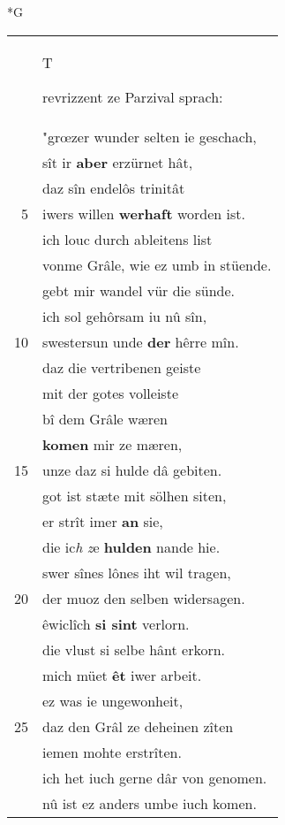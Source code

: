 \documentclass[8pt,a4paper,notitlepage]{article}
\begin{document}
\begin{table}[ht]
\begin{minipage}[t]{0.5\linewidth}
\small
\begin{center}*G
\end{center}
\begin{tabular}{rl}
 & \begin{large}T\end{large}revrizzent ze Parzival sprach:\\ 
 & "grœzer wunder selten ie geschach,\\ 
 & sît ir \textbf{aber} erzürnet hât,\\ 
 & daz sîn endelôs trinitât\\ 
5 & iwers willen \textbf{werhaft} worden ist.\\ 
 & ich louc durch ableitens list\\ 
 & vonme Grâle, wie ez umb in stüende.\\ 
 & gebt mir wandel vür die sünde.\\ 
 & ich sol gehôrsam iu nû sîn,\\ 
10 & swestersun unde \textbf{der} hêrre mîn.\\ 
 & daz die vertribenen geiste\\ 
 & mit der gotes volleiste\\ 
 & bî dem Grâle wæren\\ 
 & \textbf{komen} mir ze mæren,\\ 
15 & unze daz si hulde dâ gebiten.\\ 
 & got ist stæte mit sölhen siten,\\ 
 & er strît imer \textbf{an} sie,\\ 
 & die ic\textit{h} \textit{z}e \textbf{hulden} nande hie.\\ 
 & swer sînes lônes iht wil tragen,\\ 
20 & der muoz den selben widersagen.\\ 
 & êwiclîch \textbf{si sint} verlorn.\\ 
 & die vlust si selbe hânt erkorn.\\ 
 & mich müet \textbf{êt} iwer arbeit.\\ 
 & ez was ie ungewonheit,\\ 
25 & daz den Grâl ze deheinen zîten\\ 
 & iemen mohte erstrîten.\\ 
 & ich het iuch gerne dâr von genomen.\\ 
 & nû ist ez anders umbe iuch komen.\\ 

\end{tabular}
\end{minipage}
\end{table}
\end{document}
